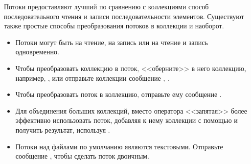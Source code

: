 \documentclass[a4paper,10pt,twoside]{book}
\begin{document}
Потоки предоставляют лучший по сравнению с коллекциями способ последовательного чтения и записи последовательности элементов. Существуют также простые способы преобразования потоков в коллекции и наоборот.

\begin{itemize}
  \item Потоки могут быть на чтение, на запись или на чтение и запись одновременно.
  \item Чтобы преобразовать коллекцию в поток, <<оберните>> в него коллекцию, например, , или отправьте коллекции сообщение , \etc.
  \item Чтобы преобразовать поток в коллекцию, отправьте ему сообщение .
  \item Для объединения больших коллекций, вместо оператора <<запятая>> более эффективно использовать поток, добавляя к нему коллекции с помощью  и получить результат, используя .
  \item Потоки над файлами по умолчанию являются текстовыми. Отправьте сообщение , чтобы сделать поток двоичным.
\end{itemize}

\ifx\wholebook\relax\else
\end{document}
